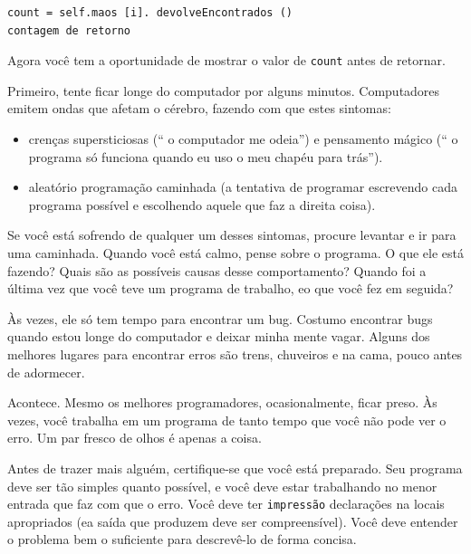 \documentclass[10pt]{book}
\begin{document}
\begin{v erbatim}
\begin{verbatim}
count = self.maos [i]. devolveEncontrados ()
contagem de retorno
\end{verbatim}
%
Agora você tem a oportunidade de mostrar o valor de
{\tt count} antes de retornar.



Primeiro, tente ficar longe do computador por alguns minutos.
Computadores emitem ondas que afetam o cérebro, fazendo com que estes
sintomas:

\begin{itemize}

 item e raiva.
\index{} raiva

\item crenças supersticiosas (`` o computador me odeia'') e
pensamento mágico (`` o programa só funciona quando eu uso o meu
chapéu para trás'').

\item aleatório programação caminhada (a tentativa de programar escrevendo
cada programa possível e escolhendo aquele que faz a direita
coisa).

\end{itemize}

Se você está sofrendo de qualquer um desses sintomas, procure
levantar e ir para uma caminhada. Quando você está calmo, pense sobre o programa.
O que ele está fazendo? Quais são as possíveis causas desse
comportamento? Quando foi a última vez que você teve um programa de trabalho,
eo que você fez em seguida?

Às vezes, ele só tem tempo para encontrar um bug. Costumo encontrar bugs
quando estou longe do computador e deixar minha mente vagar. Alguns
dos melhores lugares para encontrar erros são trens, chuveiros e na cama,
pouco antes de adormecer.



Acontece. Mesmo os melhores programadores, ocasionalmente, ficar preso.
Às vezes, você trabalha em um programa de tanto tempo que você não pode ver o
erro. Um par fresco de olhos é apenas a coisa.

Antes de trazer mais alguém, certifique-se que você está preparado.
Seu programa deve ser tão simples
quanto possível, e você deve estar trabalhando no menor entrada
que faz com que o erro. Você deve ter {\tt impressão} declarações na
locais apropriados (ea saída que produzem deve ser
compreensível). Você deve entender o problema bem o suficiente
para descrevê-lo de forma concisa.


\end{v erbatim}
\end{document}
